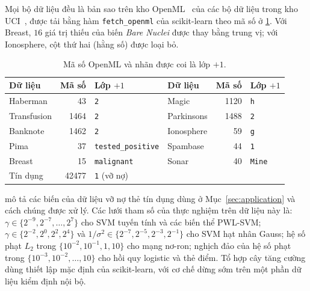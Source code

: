 Mọi bộ dữ liệu đều là bản sao trên kho OpenML~\cite{vanschoren2013} của các bộ dữ liệu trong kho UCI~\cite{kelly_uci}, được tải bằng hàm \texttt{fetch\_openml} của scikit-learn theo mã số ở \cref{tab:sources}. Với Breast, $16$ giá trị thiếu của biến \emph{Bare Nuclei} được thay bằng trung vị; với Ionosphere, cột thứ hai (hằng số) được loại bỏ.

\begin{table}[ht]
\centering
\caption[Mã số OpenML của các bộ dữ liệu]{Mã số OpenML và nhãn được coi là lớp $+1$.}
\label{tab:sources}
\small
\renewcommand{\arraystretch}{1.15}
\begin{tabular}{@{}l r l@{\qquad}l r l@{}}
\toprule
\textbf{Dữ liệu} & \textbf{Mã số} & \textbf{Lớp $+1$} & \textbf{Dữ liệu} & \textbf{Mã số} & \textbf{Lớp $+1$}\\
\midrule
Haberman & 43 & \texttt{2} & Magic & 1120 & \texttt{h}\\
Transfusion & 1464 & \texttt{2} & Parkinsons & 1488 & \texttt{2}\\
Banknote & 1462 & \texttt{2} & Ionosphere & 59 & \texttt{g}\\
Pima & 37 & \texttt{tested\_positive} & Spambase & 44 & \texttt{1}\\
Breast & 15 & \texttt{malignant} & Sonar & 40 & \texttt{Mine}\\
Tín dụng & 42477 & \texttt{1} (vỡ nợ) & & & \\
\bottomrule
\end{tabular}
\end{table}

 mô tả các biến của dữ liệu vỡ nợ thẻ tín dụng dùng ở Mục~\ref{sec:application} và cách chúng được xử lý. Các lưới tham số của thực nghiệm trên dữ liệu này là: $\gamma\in\{2^{-9},2^{-7},\dots,2^{7}\}$ cho SVM tuyến tính và các biến thể PWL-SVM; $\gamma\in\{2^{-2},2^{0},2^{2},2^{4}\}$ và $1/\sigma^2\in\{2^{-7},2^{-5},2^{-3},2^{-1}\}$ cho SVM hạt nhân Gauss; hệ số phạt $L_2$ trong $\{10^{-2},10^{-1},1,10\}$ cho mạng nơ-ron; nghịch đảo của hệ số phạt trong $\{10^{-3},10^{-2},\dots,10\}$ cho hồi quy logistic và thẻ điểm. Tổ hợp cây tăng cường dùng thiết lập mặc định của scikit-learn, với cơ chế dừng sớm trên một phần dữ liệu kiểm định nội bộ.

